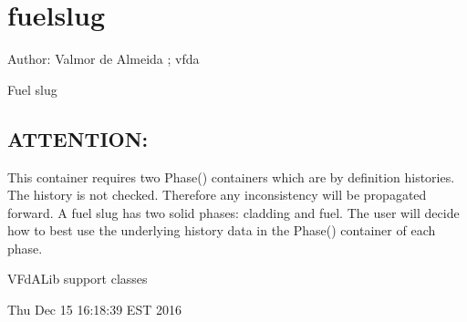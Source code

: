 \documentclass[letterpaper,10pt,openany,oneside,english]{sphinxmanual}
\begin{document}
\section{fuelslug}
\label{\detokenize{support_rst/fuelslug:module-fuelslug}}\label{\detokenize{support_rst/fuelslug:fuelslug}}\label{\detokenize{support_rst/fuelslug::doc}}
Author: Valmor de Almeida ; vfda

Fuel slug


\subsection{ATTENTION:}
\label{\detokenize{support_rst/fuelslug:attention}}
This container requires two Phase() containers which are by definition histories.
The history is not checked. Therefore any inconsistency will be propagated forward.
A fuel slug has two solid phases: cladding and fuel. The user will decide how to
best use the underlying history data in the Phase() container of each phase.

VFdALib support classes

Thu Dec 15 16:18:39 EST 2016
\end{document}

